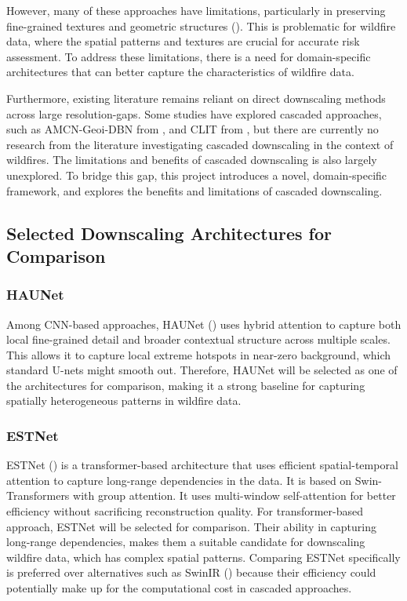\documentclass[a4paper, 11pt]{article}
\begin{document}
However, many of these approaches have limitations, particularly in preserving fine-grained textures and geometric structures (\cite{qiAdvancingImageSuperresolution2026}). This is problematic for wildfire data, where the spatial patterns and textures are crucial for accurate risk assessment. To address these limitations, there is a need for domain-specific architectures that can better capture the characteristics of wildfire data.

Furthermore, existing literature remains reliant on direct downscaling methods across large resolution-gaps. Some studies have explored cascaded approaches, such as AMCN-Geoi-DBN from \cite{jingCascadedDownscalingCalibration2022}, and CLIT from \cite{chenCascadedLocalImplicit2023}, but there are currently no research from the literature investigating cascaded downscaling in the context of wildfires. The limitations and benefits of cascaded downscaling is also largely unexplored. To bridge this gap, this project introduces a novel, domain-specific framework, and explores the benefits and limitations of cascaded downscaling.

\subsection{Selected Downscaling Architectures for Comparison} \label{sec:architectures}
\subsubsection{HAUNet}
Among CNN-based approaches, HAUNet (\cite{wangHybridAttentionBasedUShaped2023}) uses hybrid attention to capture both local fine-grained detail and broader contextual structure across multiple scales. This allows it to capture local extreme hotspots in near-zero background, which standard U-nets might smooth out. Therefore, HAUNet will be selected as one of the architectures for comparison, making it a strong baseline for capturing spatially heterogeneous patterns in wildfire data.

\subsubsection{ESTNet}
ESTNet (\cite{kangEfficientSwinTransformer2024}) is a transformer-based architecture that uses efficient spatial-temporal attention to capture long-range dependencies in the data. It is based on Swin-Transformers with group attention. It uses multi-window self-attention for better efficiency without sacrificing reconstruction quality. For transformer-based approach, ESTNet will be selected for comparison. Their ability in capturing long-range dependencies, makes them a suitable candidate for downscaling wildfire data, which has complex spatial patterns. Comparing ESTNet specifically is preferred over alternatives such as SwinIR (\cite{liangSwinIRImageRestoration2021}) because their efficiency could potentially make up for the computational cost in cascaded approaches.
\end{document}
